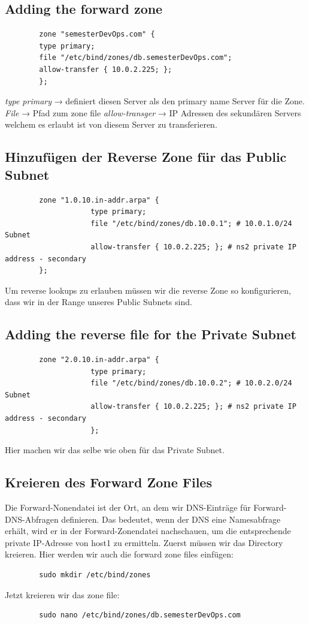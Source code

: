 \documentclass[a4paper,12pt]{article}
\begin{document}
\subsection{Adding the forward zone}
\begin{verbatim}
		zone "semesterDevOps.com" {
		type primary;
		file "/etc/bind/zones/db.semesterDevOps.com"; 
		allow-transfer { 10.0.2.225; };
		};
\end{verbatim}
\textit{type primary} → definiert diesen Server als den primary name Server für die Zone.
\textit{File} → Pfad zum zone file
\textit{allow-transger} → IP Adressen des sekundären Servers welchem es erlaubt ist von diesem Server zu transferieren.


\subsection{Hinzufügen der Reverse Zone für das Public Subnet}
\begin{verbatim}
		zone "1.0.10.in-addr.arpa" {
					type primary;
					file "/etc/bind/zones/db.10.0.1"; # 10.0.1.0/24 Subnet
					allow-transfer { 10.0.2.225; }; # ns2 private IP address - secondary
		};
\end{verbatim}
Um reverse lookups zu erlauben müssen wir die reverse Zone so konfigurieren, dass wir in der Range unseres Public Subnets sind.




\subsection{Adding the reverse file for the Private Subnet}
\begin{verbatim}
		zone "2.0.10.in-addr.arpa" {
					type primary;
					file "/etc/bind/zones/db.10.0.2"; # 10.0.2.0/24 Subnet
					allow-transfer { 10.0.2.225; }; # ns2 private IP address - secondary
					};
\end{verbatim}
Hier machen wir das selbe wie oben für das Private Subnet.

\subsection{Kreieren des Forward Zone Files}
Die Forward-Nonendatei ist der Ort, an dem wir DNS-Einträge für Forward-DNS-Abfragen definieren. 
Das bedeutet, wenn der DNS eine Namesabfrage erhält, wird er in der Forward-Zonendatei nachschauen, um die entsprechende private IP-Adresse von host1 zu ermitteln.
Zuerst müssen wir das Directory kreieren. Hier werden wir auch die forward zone files einfügen:
\begin{verbatim}
		sudo mkdir /etc/bind/zones
\end{verbatim}
Jetzt kreieren wir das zone file:
\begin{verbatim}
		sudo nano /etc/bind/zones/db.semesterDevOps.com
\end{verbatim}
\end{document}
